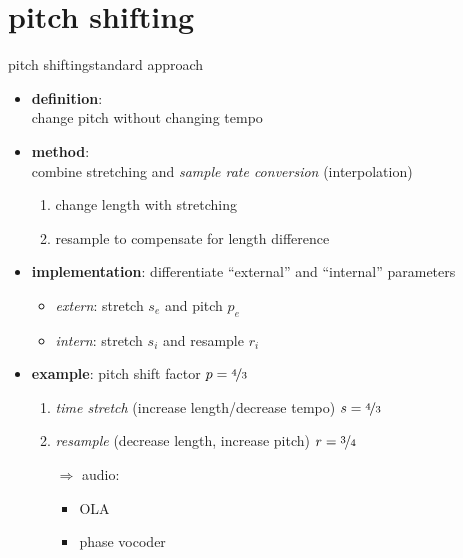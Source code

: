 \section{pitch shifting}
        \begin{frame}{pitch shifting}{standard approach}
            \begin{itemize}
                \item   \textbf{definition}:\\ change pitch without changing tempo
                \pause
                \item   \textbf{method}:\\ combine stretching and \textit{sample rate conversion} (interpolation)
                    \begin{enumerate}
                        \item   change length with stretching
                        \item   resample to compensate for length difference
                    \end{enumerate}
                \item<2->	\textbf{implementation}: differentiate ``external'' and ``internal'' parameters 
                        \begin{itemize}
                            \item	\textit{extern}: stretch $s_e$ and pitch $p_e$
                            \item	\textit{intern}: stretch $s_i$ and resample $r_i$
                        \end{itemize}
                
                \item<3-> \textbf{example}: pitch shift factor \textbf{$p = \nicefrac{4}{3}$}
					\begin{enumerate}
						\item	\textit{time stretch} (increase length/decrease tempo) $s = \nicefrac{4}{3}$
						\pause
						\item	\textit{resample} (decrease length, increase pitch) $r = \nicefrac{3}{4}$
                        \pause
                        \item[$\Rightarrow$]   audio:
                            \begin{itemize}
                                \item   OLA 
                                \item   phase vocoder 
                            \end{itemize}
					\end{enumerate}
            \end{itemize}
        \end{frame}

